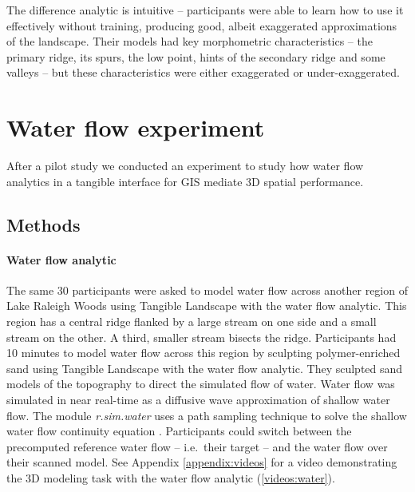 \documentclass[prodmode,acmtochi]{acmsmall} %
\begin{document}
The difference analytic is intuitive -- 
participants were able to learn how to use it effectively without training, 
producing good, albeit exaggerated approximations of the landscape. 
%
Their models had key morphometric characteristics -- 
the primary ridge, its spurs, the low point, 
hints of the secondary ridge and some valleys -- 
but these characteristics were either exaggerated or under-exaggerated.

\section{Water flow experiment}
After a pilot study \cite{Harmon2016}
we conducted an experiment to study 
how water flow analytics 
in a tangible interface for GIS
mediate 3D spatial performance.

\subsection{Methods}
\paragraph{Water flow analytic}
The same 30 participants were asked to model water flow 
across another region of Lake Raleigh Woods
using Tangible Landscape with the water flow analytic.
This region has a central ridge 
flanked by a large stream on one side 
and a small stream on the other.  
A third, smaller stream bisects the ridge.
Participants had 10 minutes to model water flow across this region
by sculpting polymer-enriched sand using Tangible Landscape 
with the water flow analytic. 
They sculpted sand models of the topography
to direct the simulated flow of water.  
Water flow was simulated in near real-time 
as a diffusive wave approximation of shallow water flow.
The module \textit{r.sim.water} \cite{r.sim.water}
uses a path sampling technique to solve the shallow water flow continuity equation \cite{Mitasova2004}.
Participants could switch between the precomputed reference water flow 
-- i.e.~their target -- 
and the water flow over their scanned model.
%
See Appendix \ref{appendix:videos}
for a video demonstrating the 3D modeling task with the water flow analytic (\ref{videos:water}).
\end{document}
